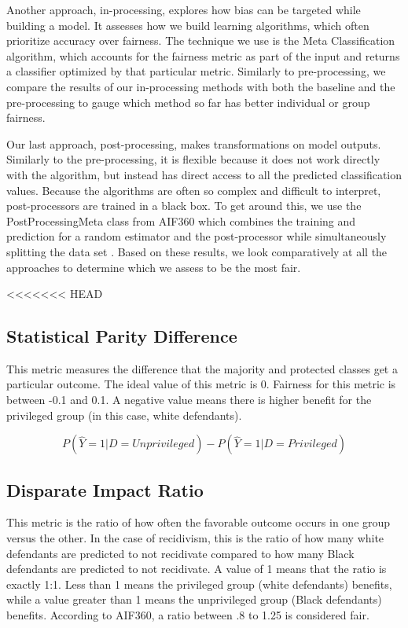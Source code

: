 \documentclass[water,article,submit,moreauthors,pdftex]{mdpi}
\begin{document}
Another approach, in-processing, explores how bias can be targeted while
building a model. It assesses how we build learning algorithms, which
often prioritize accuracy over fairness. The technique we use is the
Meta Classification algorithm, which accounts for the fairness metric as
part of the input and returns a classifier optimized by that particular
metric. Similarly to pre-processing, we compare the results of our
in-processing methods with both the baseline and the pre-processing to
gauge which method so far has better individual or group fairness.

Our last approach, post-processing, makes transformations on model
outputs. Similarly to the pre-processing, it is flexible because it does
not work directly with the algorithm, but instead has direct access to
all the predicted classification values. Because the algorithms are
often so complex and difficult to interpret, post-processors are trained
in a black box. To get around this, we use the PostProcessingMeta class
from AIF360 which combines the training and prediction for a random
estimator and the post-processor while simultaneously splitting the data
set \citep{aif360-oct-2018}. Based on these results, we look
comparatively at all the approaches to determine which we assess to be
the most fair.

<<<<<<< HEAD
\hypertarget{statistical-parity-difference}{%
\subsection{Statistical Parity
Difference}\label{statistical-parity-difference}}

This metric measures the difference that the majority and protected
classes get a particular outcome. The ideal value of this metric is 0.
Fairness for this metric is between -0.1 and 0.1. A negative value means
there is higher benefit for the privileged group (in this case, white
defendants).

\[P(\hat{Y}=1|D=Unprivileged) - P(\hat{Y}=1|D=Privileged)\]

\hypertarget{disparate-impact-ratio}{%
\subsection{Disparate Impact Ratio}\label{disparate-impact-ratio}}

This metric is the ratio of how often the favorable outcome occurs in
one group versus the other. In the case of recidivism, this is the ratio
of how many white defendants are predicted to not recidivate compared to
how many Black defendants are predicted to not recidivate. A value of 1
means that the ratio is exactly 1:1. Less than 1 means the privileged
group (white defendants) benefits, while a value greater than 1 means
the unprivileged group (Black defendants) benefits. According to AIF360,
a ratio between .8 to 1.25 is considered fair\citep{Ronaghan2019AI}.
\end{document}
